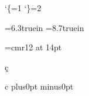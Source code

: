 
\catcode`\{=1
\catcode`\}=2

\baselineskip=12pt
\hsize=6.3truein
\vsize=8.7truein

\font\bigrm=cmr12 at 14pt

\bigrm








\c c

\hbox{c}
\newskip\zeroskip \zeroskip=0pt plus0pt minus0pt
\ifdim\ht0=1ex
    \accent24 c
    \lineskiplimit-\maxdimen
    \leavevmode
    \vtop{
        \baselineskip\zeroskip
        \lineskip.25ex
        \everycr{}
        \tabskip\zeroskip
    }
\fi





